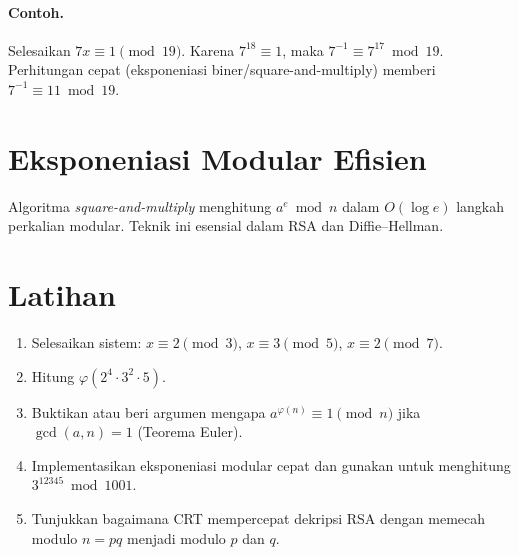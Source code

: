 \documentclass[../main.tex]{subfiles}
\begin{document}
\paragraph{Contoh.} Selesaikan \(7x\equiv 1\pmod{19}\). Karena \(7^{18}\equiv 1\), maka \(7^{-1}\equiv 7^{17} \bmod 19\). Perhitungan cepat (eksponeniasi biner/square-and-multiply) memberi \(7^{-1}\equiv 11\bmod 19\).

\section{Eksponeniasi Modular Efisien}
Algoritma \emph{square-and-multiply} menghitung \(a^e\bmod n\) dalam \(O(\log e)\) langkah perkalian modular. Teknik ini esensial dalam RSA dan Diffie--Hellman.

\section{Latihan}
\begin{enumerate}
  \item Selesaikan sistem: \(x\equiv 2\pmod 3\), \(x\equiv 3\pmod 5\), \(x\equiv 2\pmod 7\).
  \item Hitung \(\varphi(2^4\cdot 3^2\cdot 5)\).
  \item Buktikan atau beri argumen mengapa \(a^{\varphi(n)}\equiv 1\pmod n\) jika \(\gcd(a,n)=1\) (Teorema Euler).
  \item Implementasikan eksponeniasi modular cepat dan gunakan untuk menghitung \(3^{12345}\bmod 1001\).
  \item Tunjukkan bagaimana CRT mempercepat dekripsi RSA dengan memecah modulo \(n=pq\) menjadi modulo \(p\) dan \(q\).
\end{enumerate}
\end{document}
